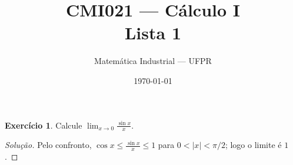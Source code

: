 \documentclass[11pt,a4paper]{article}
\title{CMI021 --- Cálculo I\\\large Lista 1}
\author{Matemática Industrial --- UFPR}
\date{\today}
\theoremstyle{definition}
\newtheorem{exercicio}{Exercício}
\newenvironment{solucao}{\begin{proof}[Solução]}{\end{proof}}
\begin{document}
\maketitle

\begin{exercicio}
Calcule $\displaystyle\lim_{x\to 0}\frac{\sin x}{x}$.
\end{exercicio}
\begin{solucao}
Pelo confronto, $\cos x \le \frac{\sin x}{x} \le 1$ para $0<|x|<\pi/2$; logo o limite é $1$.
\end{solucao}
\end{document}
